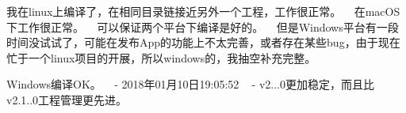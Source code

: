 我在linux上编译了，在相同目录链接近另外一个工程，工作很正常。 ~\newline
在mac\+O\+S下工作很正常。 ~\newline
可以保证两个平台下编译是好的。 ~\newline
但是\+Windows平台有一段时间没试试了，可能在发布\+App的功能上不太完善，或者存在某些bug，由于现在忙于一个linux项目的开展，所以windows的，我抽空补充完整。 ~\newline

\begin{DoxyItemize}
\item Windows编译\+O\+K。 ~\newline
-\/ 2018年01月10日19\+:05\+:52 ~\newline
 -\/ v2...\+0更加稳定，而且比v2.1..\+0工程管理更先进。 
\end{DoxyItemize}